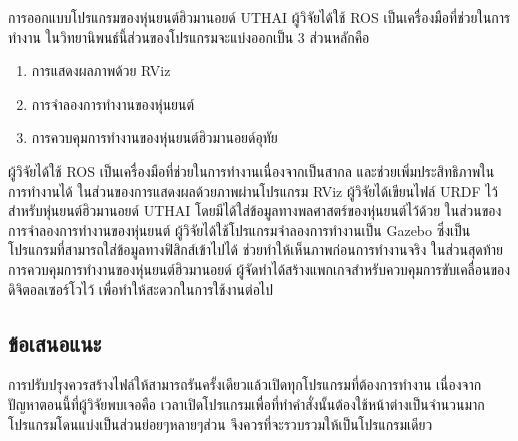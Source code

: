 การออกแบบโปรแกรมของหุ่นยนต์ฮิวมานอยด์ UTHAI ผู้วิจัยได้ใช้ ROS เป็นเครื่องมือที่ช่วยในการทำงาน
ในวิทยานิพนธ์นี้ส่วนของโปรแกรมจะแบ่งออกเป็น 3 ส่วนหลักคือ
\vspace{-3mm}
\begin{enumerate}[label=\arabic*, leftmargin=1.5cm]
	\setlength\itemsep{-0.25em}
	\item การแสดงผลภาพด้วย RViz
    \item การจำลองการทำงานของหุ่นยนต์
    \item การควบคุมการทำงานของหุ่นยนต์ฮิวมานอยด์อุทัย
\end{enumerate}

ผู้วิจัยได้ใช้ ROS เป็นเครื่องมือที่ช่วยในการทำงานเนื่องจากเป็นสากล และช่วยเพิ่มประสิทธิภาพในการทำงานได้
ในส่วนของการแสดงผลด้วยภาพผ่านโปรแกรม RViz ผู้วิจัยได้เขียนไฟล์ URDF ไว้สำหรับหุ่นยนต์ฮิวมานอยด์ UTHAI
โดยมีได้ใส่ข้อมูลทางพลศาสตร์ของหุ่นยนต์ไว้ด้วย ในส่วนของการจำลองการทำงานของหุ่นยนต์ ผู้วิจัยได้ใช้โปรแกรมจำลองการทำงานเป็น Gazebo
ซึ่งเป็นโปรแกรมที่สามารถใส่ข้อมูลทางฟิสิกส์เข้าไปได้ ช่วยทำให้เห็นภาพก่อนการทำงานจริง
ในส่วนสุดท้ายการควบคุมการทำงานของหุ่นยนต์ฮิวมานอยด์ ผู้จัดทำได้สร้างแพกเกจสำหรับควบคุมการขับเคลื่อนของดิจิตอลเซอร์โวไว้
เพื่อทำให้สะดวกในการใช้งานต่อไป

\subsection*{ข้อเสนอแนะ}
การปรับปรุงควรสร้างไฟล์ให้สามารถรันครั้งเดียวแล้วเปิดทุกโปรแกรมที่ต้องการทำงาน เนื่องจากปัญหาตอนนี้ที่ผู้วิจัยพบเจอคือ
เวลาเปิดโปรแกรมเพื่อที่ทำคำสั่งนั้นต้องใช้หน้าต่างเป็นจำนวนมาก โปรแกรมโดนแบ่งเป็นส่วนย่อยๆหลายๆส่วน จึงควรที่จะรวบรวมให้เป็นโปรแกรมเดียว

